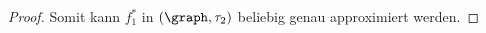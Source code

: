 \begin{corollary}
\begin{proof}
        Somit kann $f_1^*$ in $(\graph, \tau_2)$ beliebig genau approximiert werden.
    \end{proof}
\end{corollary}



